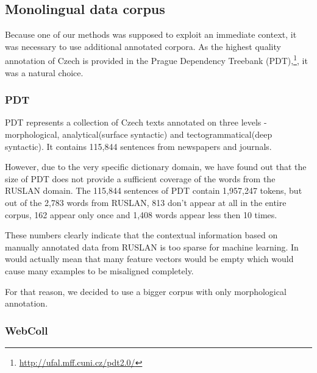 \documentclass[letterpaper]{article}
\newcommand{\todofn}[1] {
 \footnote{\textbf{TODO : #1}}}
\begin{document}

\subsection{Monolingual data corpus}
Because one of our methods was supposed to exploit an immediate context, it was necessary to use additional annotated corpora. As the highest quality annotation of Czech is provided in the Prague Dependency Treebank (PDT),\footnote{\url{http://ufal.mff.cuni.cz/pdt2.0/}}, it was a natural choice.   


\subsubsection{PDT}
PDT 
represents a collection of Czech texts annotated on three
levels - morphological, analytical(surface syntactic) and tectogrammatical(deep syntactic). It   
contains 115,844 sentences from newspapers and journals.

However, due to the very specific dictionary domain, we have found out that the size of PDT does not provide a sufficient coverage of the words from the RUSLAN domain. 
The 115,844 sentences of PDT contain 1,957,247 tokens, but out of the 2,783 words from RUSLAN, 813 don't appear at all in the entire corpus, 162 appear only once and 
1,408 words appear less then 10 times.

These numbers clearly indicate that the contextual information based on manually annotated data from RUSLAN is too sparse for machine learning. In would actually mean that many feature vectors would be empty 
which would cause 
many examples to be misaligned completely.

For that reason, we decided to use a bigger corpus with only morphological annotation.

\subsubsection{WebColl}
\end{document}
